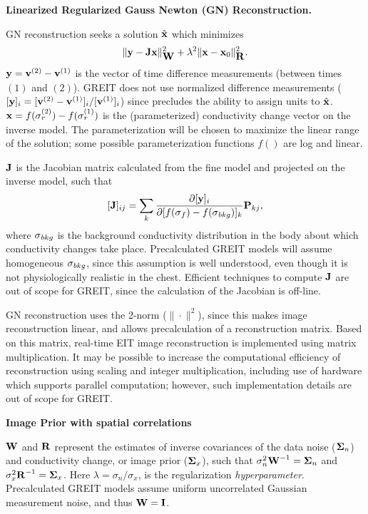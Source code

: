 \documentclass[letterpaper,twocolumn,11pt]{article}
\newcommand{\vB}{\mbox{$\bf v$}}
\newcommand{\xB}{\mbox{$\bf x$}}
\newcommand{\yB}{\mbox{$\bf y$}}
\newcommand{\JB}{\mbox{$\bf J$}}
\newcommand{\RB}{\mbox{$\bf R$}}
\newcommand{\WB}{\mbox{$\bf W$}}
\newcommand{\PB}{\mbox{$\bf P$}}
\newcommand{\IB}{\mbox{$\bf I$}}
\newcommand{\SG}{\mbox{$\bf \Sigma$}}
\newcommand{\sG}{\mbox{$\bf \sigma$}}
\begin{document}
\begin{list}{\bf {}.}
\item {\bf Linearized Regularized Gauss Newton (GN) Reconstruction.}

GN reconstruction seeks a solution $\hat{\xB}$ which minimizes
$$\| \yB - \JB \xB \|^2_{\WB} + \lambda^2\|\xB - \xB_0\|^2_{\RB}.$$
$\yB = \vB^{(2)} - \vB^{(1)}$ is the vector of
time difference measurements (between times $(1)$ and $(2)$).
GREIT does not use normalized difference measurements
($[\yB]_i = [\vB^{(2)} - \vB^{(1)}]_i / [\vB^{(1)}]_i$) since precludes
the ability to assign units to $\hat{\xB}$. 
$\xB = f(\sG^{(2)}_r) - f(\sG^{(1)}_r)$ is the (parameterized) 
conductivity change vector on the inverse model.
The parameterization will be
chosen to maximize the linear range of the solution; 
some possible parameterization functions $f()$ are log and linear.

$\JB$ is the Jacobian matrix calculated from the 
fine model and projected on the inverse model,
such that 
$$[\JB]_{ij} = \sum_k \frac{\partial [\yB ]_i}
                           {\partial [ f(\sG_f) - f(\sG_{bkg}) ]_k}
                           \PB_{kj} ,$$ 
where $\sG_{bkg}$ is the background conductivity distribution in 
the body about which conductivity changes take place. Precalculated
GREIT models will assume homogeneous $\sG_{bkg}$, since this
assumption is well understood, even though it is not
physiologically realistic in the chest. Efficient techniques
to compute $\JB$ are out of scope for GREIT, since the calculation
of the Jacobian is off-line.

GN reconstruction uses the 2-norm ($\| \cdot \|^2$), since this
makes image reconstruction linear, and allows precalculation
of a reconstruction matrix. Based on this matrix, real-time
EIT image reconstruction is implemented using matrix multiplication.
It may be possible to increase the computational efficiency
of reconstruction using scaling and integer multiplication,
including use of hardware which supports parallel computation;
however, such implementation details are out of scope for GREIT.

\item {\bf Image Prior with spatial correlations}

$\WB$ and $\RB$ represent the estimates of inverse covariances
of the data noise ($\SG_n$) and conductivity change, or
image prior ($\SG_x$), such that
$\sigma_n^2 \WB^{-1}= \SG_n$ and
$\sigma_x^2 \RB^{-1}= \SG_x$. Here $\lambda= \sigma_n/\sigma_x$,
is the regularization {\em hyperparameter}.
Precalculated GREIT models assume uniform uncorrelated
Gaussian measurement noise, and thus $\WB = \IB$.


\end{list}
\end{document}
